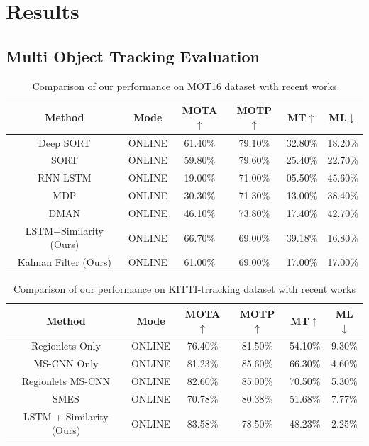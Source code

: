 \chapter{Results}

\section{Multi Object Tracking Evaluation}

\begin{table}[h]
	\caption{Comparison  of  our  performance  on  MOT16  dataset  with  recent  works}
	\label{MOT16 Results}
	\begin{center}
		\begin{tabular}{|c||c||c||c||c||c|}
			\hline
			Method & Mode & MOTA$\uparrow$ & MOTP$\uparrow$ & MT$\uparrow$ & ML$\downarrow$\\
			\hline
			Deep SORT \cite{DeepSiam:deepSort} & ONLINE & 61.40\% & 79.10\% & 32.80\% & 18.20\%\\
			\hline
			SORT \cite{DeepSiam:Sort} & ONLINE & 59.80\% & 79.60\% & 25.40\% & 22.70\%\\
			\hline
			RNN LSTM \cite{DeepSiam:multitarget} & ONLINE & 19.00\% & 71.00\% & 05.50\% & 45.60\%\\
			\hline
			MDP \cite{DeepSiam:learntotrack} & ONLINE & 30.30\% & 71.30\% & 13.00\% & 38.40\%\\
			\hline
			DMAN \cite{DeepSiam:attention} & ONLINE & 46.10\% & 73.80\% & 17.40\% & 42.70\%\\
			\hline
			LSTM+Similarity (Ours) & ONLINE & 66.70\% & 69.00\% & 39.18\% & 16.80\%\\
			\hline
			Kalman Filter (Ours) & ONLINE & 61.00\% & 69.00\% & 17.00\% & 17.00\%\\
			\hline
		\end{tabular}
	\end{center}
\end{table}

\begin{table}[h]
	\caption{Comparison  of  our  performance  on  KITTI-trracking  dataset  with  recent  works}
	\label{KITTI Results}
	\begin{center}
		\begin{tabular}{|c||c||c||c||c||c|}
			\hline
			Method & Mode & MOTA$\uparrow$ & MOTP$\uparrow$ & MT$\uparrow$ & ML$\downarrow$\\
			\hline
			Regionlets Only \cite{DeepSiam:kalman} & ONLINE & 76.40\% & 81.50\% & 54.10\% & 9.30\%\\
			\hline
			MS-CNN Only \cite{DeepSiam:kalman} & ONLINE & 81.23\% & 85.60\% & 66.30\% & 4.60\%\\
			\hline
			Regionlets MS-CNN \cite{DeepSiam:kalman} & ONLINE & 82.60\% & 85.00\% & 70.50\% & 5.30\%\\
			\hline
			SMES \cite{DeepSiam:simmap} & ONLINE & 70.78\% & 80.38\% & 51.68\% & 7.77\%\\
			\hline
			LSTM + Similarity (Ours) & ONLINE & 83.58\% & 78.50\% & 48.23\% & 2.25\%\\
			\hline
		\end{tabular}
	\end{center}
\end{table}

